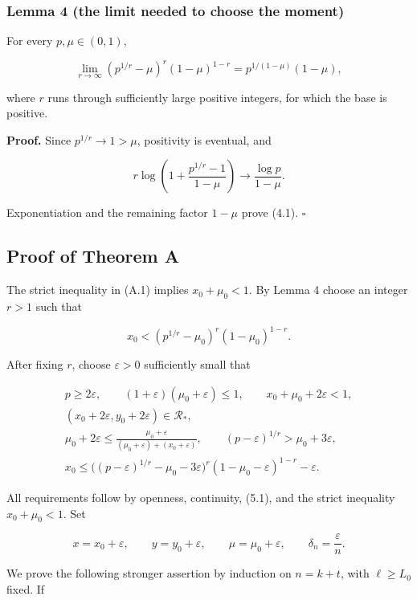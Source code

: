 \subsubsection{Lemma 4 (the limit needed to choose the moment)}

For every \(p,\mu\in(0,1)\),

\[
\lim_{r\to\infty}
(p^{1/r}-\mu)^r(1-\mu)^{1-r}
=p^{1/(1-\mu)}(1-\mu),
\tag{4.1}
\]

where \(r\) runs through sufficiently large positive integers, for which
the base is positive.

\textbf{Proof.} Since \(p^{1/r}\to1>\mu\), positivity is eventual, and

\[
r\log\left(1+\frac{p^{1/r}-1}{1-\mu}\right)
\longrightarrow\frac{\log p}{1-\mu}.
\]

Exponentiation and the remaining factor \(1-\mu\) prove (4.1).
\(\square\)

\subsection{Proof of Theorem A}

The strict inequality in (A.1) implies \(x_0+\mu_0<1\). By Lemma 4
choose an integer \(r>1\) such that

\[
x_0<(p^{1/r}-\mu_0)^r(1-\mu_0)^{1-r}.
\tag{5.1}
\]

After fixing \(r\), choose \(\varepsilon>0\) sufficiently small that

\[
\begin{gathered}
p\ge2\varepsilon,\qquad
(1+\varepsilon)(\mu_0+\varepsilon)\le1,\qquad
x_0+\mu_0+2\varepsilon<1,\\
(x_0+2\varepsilon,y_0+2\varepsilon)\in\mathcal R_*,\\
\mu_0+2\varepsilon
\le\frac{\mu_0+\varepsilon}
{(\mu_0+\varepsilon)+(x_0+\varepsilon)},\qquad
(p-\varepsilon)^{1/r}>\mu_0+3\varepsilon,\\
x_0\le
\big((p-\varepsilon)^{1/r}-\mu_0-3\varepsilon\big)^r
(1-\mu_0-\varepsilon)^{1-r}-\varepsilon.
\tag{5.2}
\end{gathered}
\]

All requirements follow by openness, continuity, (5.1), and the strict
inequality \(x_0+\mu_0<1\). Set

\[
x=x_0+\varepsilon,\qquad y=y_0+\varepsilon,\qquad
\mu=\mu_0+\varepsilon,\qquad \delta_n=\frac\varepsilon n.
\tag{5.3}
\]

We prove the following stronger assertion by induction on \(n=k+t\),
with \(\ell\ge L_0\) fixed. If

